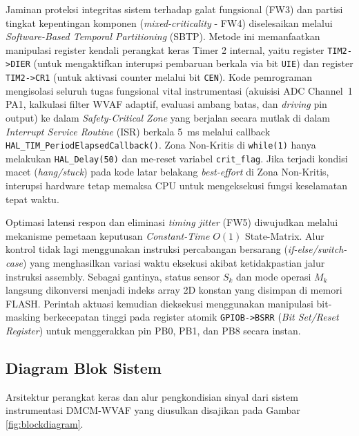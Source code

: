 \documentclass[11pt,a4paper]{article}
\begin{document}
\begin{longtable}
Jaminan proteksi integritas sistem terhadap galat fungsional (FW3) dan partisi tingkat kepentingan komponen (\textit{mixed-criticality} - FW4) diselesaikan melalui \textit{Software-Based Temporal Partitioning} (SBTP). Metode ini memanfaatkan manipulasi register kendali perangkat keras Timer 2 internal, yaitu register \texttt{TIM2->DIER} (untuk mengaktifkan interupsi pembaruan berkala via bit \texttt{UIE}) dan register \texttt{TIM2->CR1} (untuk aktivasi counter melalui bit \texttt{CEN}). Kode pemrograman mengisolasi seluruh tugas fungsional vital instrumentasi (akuisisi ADC Channel~1 PA1, kalkulasi filter WVAF adaptif, evaluasi ambang batas, dan \textit{driving} pin output) ke dalam \textit{Safety-Critical Zone} yang berjalan secara mutlak di dalam \textit{Interrupt Service Routine} (ISR) berkala 5~ms melalui callback \texttt{HAL\_TIM\_PeriodElapsedCallback()}. Zona Non-Kritis di \texttt{while(1)} hanya melakukan \texttt{HAL\_Delay(50)} dan me-reset variabel \texttt{crit\_flag}. Jika terjadi kondisi macet (\textit{hang/stuck}) pada kode latar belakang \textit{best-effort} di Zona Non-Kritis, interupsi hardware tetap memaksa CPU untuk mengeksekusi fungsi keselamatan tepat waktu.

Optimasi latensi respon dan eliminasi \textit{timing jitter} (FW5) diwujudkan melalui mekanisme pemetaan keputusan \textit{Constant-Time} $O(1)$ State-Matrix. Alur kontrol tidak lagi menggunakan instruksi percabangan bersarang (\textit{if-else/switch-case}) yang menghasilkan variasi waktu eksekusi akibat ketidakpastian jalur instruksi assembly. Sebagai gantinya, status sensor $S_k$ dan mode operasi $M_k$ langsung dikonversi menjadi indeks array 2D konstan yang disimpan di memori FLASH. Perintah aktuasi kemudian dieksekusi menggunakan manipulasi bit-masking berkecepatan tinggi pada register atomik \texttt{GPIOB->BSRR} (\textit{Bit Set/Reset Register}) untuk menggerakkan pin PB0, PB1, dan PB8 secara instan.

\subsection{Diagram Blok Sistem}
\hspace{1.5em}Arsitektur perangkat keras dan alur pengkondisian sinyal dari sistem instrumentasi DMCM-WVAF yang diusulkan disajikan pada Gambar \ref{fig:blockdiagram}.

\begin{figure}[htbp]
\centering
{}
\end{figure}
\end{longtable}
\end{document}
